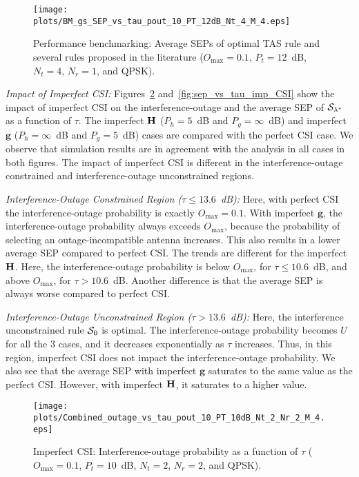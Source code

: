\documentclass[12pt,draftcls,peerreview,onecolumn]{IEEEtran}
\newcommand{\mtx}[1]{{\bf #1}} %
\newcommand{\lam}{\lambda}
\newcommand{\Nt}{{N_t}}
\newcommand{\Nr}{{N_r}}
\newcommand{\Pt}{{P_t}}
\newcommand{\puch}{g}
\newcommand{\g}{\mathbf{\puch}}
\newcommand{\outmax}{O_{\text{max}}}
\newcommand{\itau}{\tau}
\newcommand{\un}{U}
\newcommand{\Hmx}{\mtx{H}}
\newcommand{\caluncons}{{\cal S_{\text{0}}}}
\newcommand{\callamstarrule}{\cal S_{\lam^{*}}}
\newcommand{\gpilotpower}{P_g}
\newcommand{\hpilotpower}{P_h}
\begin{document}
\begin{figure}
	\centering \texttt{[image: plots/BM\_gs\_SEP\_vs\_tau\_pout\_10\_PT\_12dB\_Nt\_4\_M\_4.eps]}
	\caption{Performance benchmarking: Average SEPs of optimal TAS rule and several rules proposed in the literature ($\outmax = 0.1$, $\Pt = 12$~dB, $\Nt = 4$, $\Nr=1$, and QPSK).}
	\label{fig:BM_SEP_vs_tau}
\end{figure}


{\em Impact of Imperfect CSI:} Figures~\ref{fig:out_vs_tau_imp_CSI} and~\ref{fig:sep_vs_tau_imp_CSI} show the impact of imperfect CSI on the interference-outage and the average SEP of $\callamstarrule$ as a function of $\tau$. The imperfect $\Hmx$ ($\hpilotpower=5$~dB and $\gpilotpower=\infty$~dB) and imperfect $\g$ ($\hpilotpower=\infty$~dB and $\gpilotpower=5$~dB) cases are compared with the perfect CSI case. We observe that simulation results are in agreement with the analysis in all cases in both figures. The impact of imperfect CSI is different in the interference-outage constrained and interference-outage unconstrained regions. 

{\em Interference-Outage Constrained Region ($\itau\leq13.6$~dB):} Here, with perfect CSI the interference-outage probability is exactly $\outmax=0.1$. With imperfect $\g$, the interference-outage probability always exceeds  $\outmax$, because the probability of selecting an outage-incompatible antenna increases. This also results in a  lower average SEP compared to perfect CSI. The trends are different for the imperfect $\Hmx$. Here, the interference-outage probability is below $\outmax$, for $\itau\leq10.6$~dB, and above $\outmax$, for $\itau>10.6$~dB. Another difference is that the average SEP is always worse compared to perfect CSI.    

{\em Interference-Outage Unconstrained Region ($\itau>13.6$~dB):} Here, the interference unconstrained rule $\caluncons$ is optimal. The interference-outage probability becomes $\un$ for all the 3 cases, and it decreases exponentially as $\itau$ increases. Thus, in this region, imperfect CSI does not impact the interference-outage probability. We also see that the average SEP with imperfect $\g$ saturates to the same value as the perfect CSI. However, with imperfect $\Hmx$, it saturates to a higher value. %

\begin{figure}
	\centering \texttt{[image: plots/Combined\_outage\_vs\_tau\_pout\_10\_PT\_10dB\_Nt\_2\_Nr\_2\_M\_4.eps]}
	\caption{Imperfect CSI: Interference-outage probability as a function of $\itau$ ($\outmax=0.1$, $\Pt = 10$~dB, $\Nt = 2$, $\Nr = 2$, and QPSK).}
	\label{fig:out_vs_tau_imp_CSI}
\end{figure}
\end{document}
